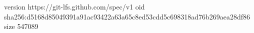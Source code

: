 version https://git-lfs.github.com/spec/v1
oid sha256:d5168d85049391a91ac93422a63a65c8ed53cdd5c698318ad76b269aea28df86
size 547089
